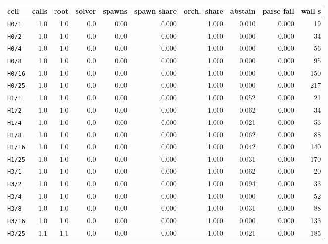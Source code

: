 \begin{tabular}{lrrrrrrrrr}
\toprule
cell & calls & root & solver & spawns & spawn share & orch.\ share & abstain & parse fail & wall s \\ \midrule
\texttt{H0/1} & 1.0 & 1.0 & 0.0 & 0.00 & 0.000 & 1.000 & 0.010 & 0.000 & 19 \\
\texttt{H0/2} & 1.0 & 1.0 & 0.0 & 0.00 & 0.000 & 1.000 & 0.000 & 0.000 & 34 \\
\texttt{H0/4} & 1.0 & 1.0 & 0.0 & 0.00 & 0.000 & 1.000 & 0.000 & 0.000 & 56 \\
\texttt{H0/8} & 1.0 & 1.0 & 0.0 & 0.00 & 0.000 & 1.000 & 0.000 & 0.000 & 95 \\
\texttt{H0/16} & 1.0 & 1.0 & 0.0 & 0.00 & 0.000 & 1.000 & 0.000 & 0.000 & 150 \\
\texttt{H0/25} & 1.0 & 1.0 & 0.0 & 0.00 & 0.000 & 1.000 & 0.000 & 0.000 & 217 \\
\texttt{H1/1} & 1.0 & 1.0 & 0.0 & 0.00 & 0.000 & 1.000 & 0.052 & 0.000 & 21 \\
\texttt{H1/2} & 1.0 & 1.0 & 0.0 & 0.00 & 0.000 & 1.000 & 0.062 & 0.000 & 34 \\
\texttt{H1/4} & 1.0 & 1.0 & 0.0 & 0.00 & 0.000 & 1.000 & 0.021 & 0.000 & 53 \\
\texttt{H1/8} & 1.0 & 1.0 & 0.0 & 0.00 & 0.000 & 1.000 & 0.062 & 0.000 & 88 \\
\texttt{H1/16} & 1.0 & 1.0 & 0.0 & 0.00 & 0.000 & 1.000 & 0.042 & 0.000 & 140 \\
\texttt{H1/25} & 1.0 & 1.0 & 0.0 & 0.00 & 0.000 & 1.000 & 0.031 & 0.000 & 170 \\
\texttt{H3/1} & 1.0 & 1.0 & 0.0 & 0.00 & 0.000 & 1.000 & 0.062 & 0.000 & 20 \\
\texttt{H3/2} & 1.0 & 1.0 & 0.0 & 0.00 & 0.000 & 1.000 & 0.094 & 0.000 & 33 \\
\texttt{H3/4} & 1.0 & 1.0 & 0.0 & 0.00 & 0.000 & 1.000 & 0.000 & 0.000 & 52 \\
\texttt{H3/8} & 1.0 & 1.0 & 0.0 & 0.00 & 0.000 & 1.000 & 0.031 & 0.000 & 88 \\
\texttt{H3/16} & 1.0 & 1.0 & 0.0 & 0.00 & 0.000 & 1.000 & 0.000 & 0.000 & 133 \\
\texttt{H3/25} & 1.1 & 1.1 & 0.0 & 0.00 & 0.000 & 1.000 & 0.021 & 0.000 & 185 \\
\bottomrule
\end{tabular}
